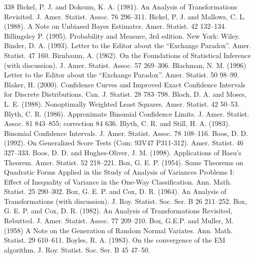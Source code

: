 \begin{thebibliography}{338}
\label{bib:source31} Bickel, P. J. and Doksum, K. A. (1981). An Analysis of Transformations Revisited. J. Amer. Statist. Assoc. 76 296–311.
\label{bib:source32} Bickel, P. J. and Mallows, C. L. (1988). A Note on Unbiased Bayes Estimates. Amer. Statist. 42 132–134.
\label{bib:source33} Billingsley P. (1995). Probability and Measure, 3rd edition. New York: Wiley.
\label{bib:source34} Binder, D. A. (1993). Letter to the Editor about the “Exchange Paradox”. Amer. Statist. 47 160.
\label{bib:source35} Birnbaum, A. (1962). On the Foundations of Statistical Inference (with discussion). J. Amer. Statist. Assoc. 57 269–306.
\label{bib:source36} Blachman, N. M. (1996) Letter to the Editor about the “Exchange Paradox”. Amer. Statist. 50 98–99.
\label{bib:source37} Blaker, H. (2000). Confidence Curves and Improved Exact Confidence Intervals for Discrete Distributions. Can. J. Statist. 28 783–798.
\label{bib:source38} Bloch, D. A. and Moses, L. E. (1988). Nonoptimally Weighted Least Squares. Amer. Statist. 42 50–53.
\label{bib:source39} Blyth, C. R. (1986). Approximate Binomial Confidence Limits. J. Amer. Statist. Assoc. 81 843–855; correction 84 636.
\label{bib:source40} Blyth, C. R. and Still, H. A. (1983). Binomial Confidence Intervals. J. Amer. Statist. Assoc. 78 108–116.
\label{bib:source41} Boos, D. D. (1992). On Generalized Score Tests (Com: 93V47 P311-312). Amer. Statist. 46 327–333.
\label{bib:source42} Boos, D. D. and Hughes-Oliver, J. M. (1998). Applications of Basu’s Theorem. Amer. Statist. 52 218–221.
\label{bib:source43} Box, G. E. P. (1954). Some Theorems on Quadratic Forms Applied in the Study of Analysis of Variances Problems I: Effect of Inequality of Variance in the One-Way Classification. Ann. Math. Statist. 25 290–302.
\label{bib:source44} Box, G. E. P. and Cox, D. R. (1964). An Analysis of Transformations (with discussion). J. Roy. Statist. Soc. Ser. B 26 211–252.
\label{bib:source45} Box, G. E. P. and Cox, D. R. (1982). An Analysis of Transformations Revisited, Rebutted. J. Amer. Statist. Assoc. 77 209–210.
\label{bib:source46} Box, G.E.P. and Muller, M. (1958) A Note on the Generation of Random Normal Variates. Ann. Math. Statist. 29 610–611.
\label{bib:source47} Boyles, R. A. (1983). On the convergence of the EM algorithm. J. Roy. Statist. Soc. Ser. B 45 47–50.

\end{thebibliography}
